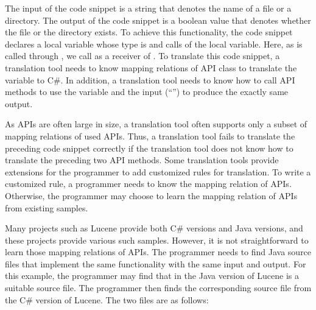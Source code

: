 The input of the code snippet is a string that denotes the name of a
file or a directory. The output of the code snippet is a boolean
value that denotes whether the file or the directory exists. To
achieve this functionality, the code snippet declares a local
variable whose type is  and calls
 of the local variable. Here, as 
is called through , we call  as a receiver
of . To translate this code snippet, a translation
tool needs to know mapping relations of API class to translate the
variable  to C\#. In addition, a translation tool needs
to know how to call API methods to use the variable and the input
(``'') to produce the exactly same output.

As APIs are often large in size, a translation tool often supports
only a subset of mapping relations of used APIs. Thus, a translation
tool fails to translate the preceding code snippet correctly if the
translation tool does not know how to translate the preceding two
API methods. Some translation tools provide extensions for the
programmer to add customized rules for translation. To write a
customized rule, a programmer needs to know the mapping relation of
APIs. Otherwise, the programmer may choose to learn the mapping
relation of APIs from existing samples.

Many projects such as Lucene provide both C\# versions and Java
versions, and these projects provide various such samples. However,
it is not straightforward to learn those mapping relations of APIs.
The programmer needs to find Java source files that implement the
same functionality with the same input and output. For this example,
the programmer may find that  in the Java
version of Lucene is a suitable source file. The programmer then
finds the corresponding source file  from the
C\# version of Lucene. The two files are as follows:

